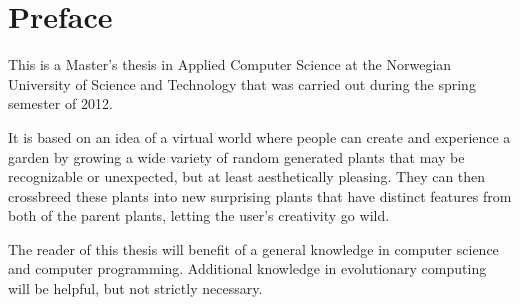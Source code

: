 \hypersetup{pageanchor=false}
%

\chapter*{Preface}
This is a Master's thesis in Applied Computer Science at the Norwegian University of Science and Technology that was carried out during the spring semester of 2012.

It is based on an idea of a virtual world where people can create and experience a garden by growing a wide variety of random generated plants that may be recognizable or unexpected, but at least aesthetically pleasing.
They can then crossbreed these plants into new surprising plants that have distinct features from both of the parent plants, letting the user's creativity go wild.

The reader of this thesis will benefit of a general knowledge in computer science and computer programming.
Additional knowledge in evolutionary computing will be helpful, but not strictly necessary.

\thesisdate \\[1pc]
\\[1pc]
